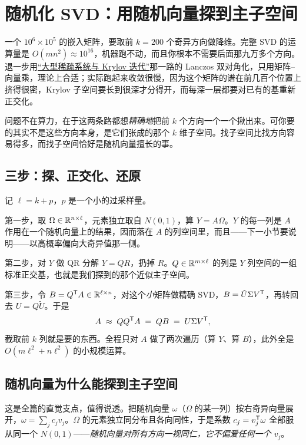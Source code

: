 \section{随机化 SVD：用随机向量探到主子空间}
\label{sec:08-Numerical-Analysis/05-Numerical-Linear-Algebra/09}

一个 \(10^6\times10^5\) 的嵌入矩阵，要取前 \(k=200\) 个奇异方向做降维。完整 SVD 的运算量是 \(O(mn^2)\approx10^{16}\)，机器跑不动，而且你根本不需要后面那九万多个方向。退一步用\hyperref[sec:08-Numerical-Analysis/05-Numerical-Linear-Algebra/04]{``大型稀疏系统与 Krylov 迭代''}那一路的 Lanczos 双对角化，只用矩阵--向量乘，理论上合适；实际跑起来收敛很慢，因为这个矩阵的谱在前几百个位置上挤得很密，Krylov 子空间要长到很深才分得开，而每深一层都要对已有的基重新正交化。

问题不在算力，在于这两条路都想\emph{精确地}把前 \(k\) 个方向一个一个揪出来。可你要的其实不是这些方向本身，是它们张成的那个 \(k\) 维子空间。找子空间比找方向容易得多，而找子空间恰好是随机向量擅长的事。

\subsection{三步：探、正交化、还原}

记 \(\ell=k+p\)，\(p\) 是一个小的过采样量。

第一步，取 \(\Omega\in\mathbb{R}^{n\times\ell}\)，元素独立取自 \(N(0,1)\)，算 \(Y=A\Omega\)。\(Y\) 的每一列是 \(A\) 作用在一个随机向量上的结果，因而落在 \(A\) 的列空间里，而且——下一小节要说明——以高概率偏向大奇异值那一侧。

第二步，对 \(Y\) 做 QR 分解 \(Y=QR\)，扔掉 \(R\)。\(Q\in\mathbb{R}^{m\times\ell}\) 的列是 \(Y\) 列空间的一组标准正交基，也就是我们探到的那个近似主子空间。

第三步，令 \(B=Q^{\mathsf{T}}A\in\mathbb{R}^{\ell\times n}\)，对这个\emph{小}矩阵做精确 SVD，\(B=\tilde U\Sigma V^{\mathsf{T}}\)，再转回去 \(U=Q\tilde U\)。于是
\[
A\;\approx\;QQ^{\mathsf{T}}A\;=\;Q B\;=\;U\Sigma V^{\mathsf{T}},
\]
截取前 \(k\) 列就是要的东西。全程只对 \(A\) 做了两次遍历（算 \(Y\)、算 \(B\)），此外全是 \(O(m\ell^2+n\ell^2)\) 的小规模运算。

\subsection{随机向量为什么能探到主子空间}

这是全篇的直觉支点，值得说透。把随机向量 \(\omega\)（\(\Omega\) 的某一列）按右奇异向量展开，\(\omega=\sum_j c_jv_j\)。\(\Omega\) 的元素独立同分布且各向同性，于是系数 \(c_j=v_j^{\mathsf{T}}\omega\) 全部服从同一个 \(N(0,1)\)——\emph{随机向量对所有方向一视同仁，它不偏爱任何一个 \(v_j\)}。

